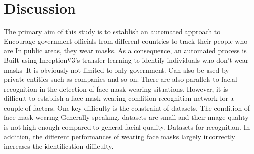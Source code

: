 \chapter{Discussion}
The primary aim of this study is to establish an automated approach to
Encourage government officials from different countries to track their people who are
In public areas, they wear masks. As a consequence, an automated process is \cite{chowdary2020face}
Built using InceptionV3's transfer learning to identify individuals who don't wear masks.
It is obviously not limited to only government. Can also be used by private entities such as companies and so on. There are also parallels to facial recognition in the detection of face mask wearing situations. \cite{albawi2017understanding}
However, it is difficult to establish a face mask wearing condition recognition network for a couple of factors. One key difficulty is the constraint of datasets. The condition of face mask-wearing
Generally speaking, datasets are small and their image quality is not high enough compared to general facial quality.
Datasets for recognition. In addition, the different performances of wearing face masks largely incorrectly increases the identification difficulty.